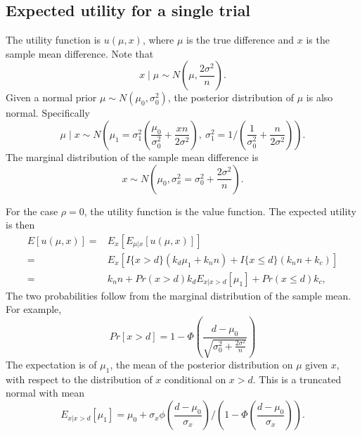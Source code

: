 \documentclass[sagev, Crown]{sagej} %
\begin{document}
\subsection*{Expected utility for a single trial}

The utility function is $u(\mu, x)$, where $\mu$ is the true difference and $x$ is the sample mean difference. Note that
$$
x \mid \mu \sim N\left(\mu, \frac{2\sigma^2}{n} \right).
$$
Given a normal prior $\mu \sim N(\mu_0, \sigma_0^2)$, the posterior distribution of $\mu$ is also normal. Specifically
$$
\mu \mid x \sim N \left( \mu_1 = \sigma_1^2 \left( \frac{\mu_0}{\sigma_0^2} + \frac{xn}{2\sigma^2} \right), ~ \sigma_1^2 = 1/\left( \frac{1}{\sigma_0^2} + \frac{n}{2\sigma^2} \right) \right).
$$
The marginal distribution of the sample mean difference is
$$
x \sim N\left(\mu_0, \sigma_x^2 = \sigma_0^2 + \frac{2\sigma^2}{n} \right).
$$

For the case $\rho = 0$, the utility function is the value function. The expected utility is then
\begin{align*}
E[u(\mu, x)] =& E_x\left[ E_{\mu | x} [u(\mu, x)] \right] \\
=& E_x \left[ I\{x > d\} (k_d \mu_1 + k_n n) + I\{x \leq d\} (k_n n + k_c) \right] \\
=& k_n n + Pr(x > d) k_d E_{x | x > d} \left[ \mu_1 \right] + Pr(x \leq d)k_c,
\end{align*}
The two probabilities follow from the marginal distribution of the sample mean. For example,
$$
Pr[x > d] = 1- \Phi\left(\frac{d-\mu_0}{\sqrt{\sigma_0^2 + \frac{2\sigma^2}{n}}} \right)
$$
The expectation is of $\mu_1$, the mean of the posterior distribution on $\mu$ given $x$, with respect to the distribution of $x$ conditional on $x > d$. This is a truncated normal with mean
$$
E_{x | x > d} \left[ \mu_1 \right] = \mu_0 + \sigma_x \phi\left(\frac{d - \mu_0}{\sigma_x} \right)/\left(1 - \Phi\left(\frac{d - \mu_0}{\sigma_x}\right) \right).
$$
\end{document}
